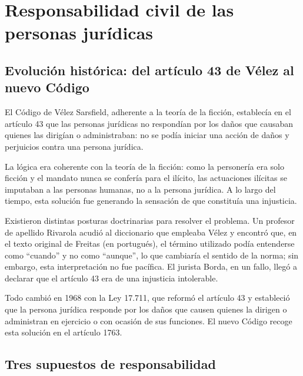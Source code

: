 \documentclass[12pt,oneside]{book}
\begin{document}
\chapter{Responsabilidad civil de las personas jurídicas}

\section{Evolución histórica: del artículo 43 de Vélez al nuevo Código}

El Código de Vélez Sarsfield, adherente a la teoría de la ficción, establecía en el artículo 43 que las personas jurídicas no respondían por los daños que causaban quienes las dirigían o administraban: no se podía iniciar una acción de daños y perjuicios contra una persona jurídica.

La lógica era coherente con la teoría de la ficción: como la personería era solo ficción y el mandato nunca se confería para el ilícito, las actuaciones ilícitas se imputaban a las personas humanas, no a la persona jurídica. A lo largo del tiempo, esta solución fue generando la sensación de que constituía una injusticia.

Existieron distintas posturas doctrinarias para resolver el problema. Un profesor de apellido Rivarola acudió al diccionario que empleaba Vélez y encontró que, en el texto original de Freitas (en portugués), el término utilizado podía entenderse como ``cuando'' y no como ``aunque'', lo que cambiaría el sentido de la norma; sin embargo, esta interpretación no fue pacífica. El jurista Borda, en un fallo, llegó a declarar que el artículo 43 era de una injusticia intolerable.

\begin{important}
Todo cambió en 1968 con la Ley 17.711, que reformó el artículo 43 y estableció que la persona jurídica responde por los daños que causen quienes la dirigen o administran en ejercicio o con ocasión de sus funciones. El nuevo Código recoge esta solución en el artículo 1763.
\end{important}

\section{Tres supuestos de responsabilidad}
\end{document}

